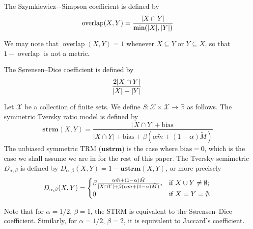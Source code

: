		\begin{definition}
			The Szymkiewicz–-Simpson coefficient is defined by
			\[
				 \operatorname{overlap}(X,Y) = \frac{\lvert X \cap Y\rvert}{\min(\lvert X\rvert,\lvert Y\rvert)}
			\]
		\end{definition}
		We may note that $\operatorname{overlap}(X,Y)=1$ whenever $X\subseteq Y$ or $Y\subseteq X$, so that $1-\operatorname{overlap}$ is not a metric.
		\begin{definition}\label{dice}
			The S{\o}rensen--Dice coefficient is defined by
			\[
				\frac{2\lvert X\cap Y\rvert}{\lvert X\rvert+\lvert Y\rvert}.
			\]
		\end{definition}
		\begin{definition}\label{symm}
			Let $\mathcal X$ be a collection of finite sets. We define $S:\mathcal X\times\mathcal X\to \mathbb R$ as follows.
			The symmetric Tversky ratio model is defined by
			\[
				\mathbf{strm}(X,Y)=\frac{| X \cap Y |+\mathrm{bias}}{| X \cap Y |+\mathrm{bias}+\beta\left(\alpha \tilde m+(1-\alpha)\tilde M\right)}
			\]
			The unbiased symmetric TRM ($\mathbf{ustrm}$) is the case where $\mathrm{bias}=0$, which is the case we shall assume we are in for the rest of this paper.
			The Tversky semimetric $D_{\alpha,\beta}$ is defined by $D_{\alpha,\beta}(X,Y)=1-\mathbf{ustrm}(X,Y)$, or more precisely
			\[
			D_{\alpha,\beta}(X,Y) = 
			\begin{cases}
				\beta \frac{\alpha \tilde m + (1-\alpha)\tilde M}{\lvert X\cap Y\rvert+\beta(\alpha \tilde m + (1-\alpha)\tilde M)}, & \text{if }X\cup Y\ne\emptyset;\\
				0 & \text{if }X=Y=\emptyset.
			\end{cases}
			\]
		\end{definition}
		Note that for $\alpha = 1/2$, $\beta = 1$,
		the STRM is equivalent to the S{\o}rensen--Dice coefficient.
		Similarly,
		for $\alpha = 1/2$, $\beta = 2$, it is equivalent to Jaccard's coefficient.



